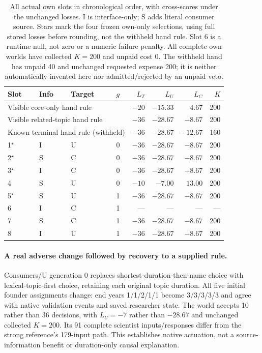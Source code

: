 \begin{table}[t]
\centering\small
\setlength{\tabcolsep}{5pt}
\begin{tabular}{llllrrrr}
\toprule
Slot & Info & Target & $g$ & $L_T$ & $L_U$ & $L_C$ & $K$\\
\midrule
\multicolumn{4}{l}{Visible core-only hand rule} & $-20$ & $-15.33$ & $4.67$ & 200\\
\multicolumn{4}{l}{Visible related-topic hand rule} & $-36$ & $-28.67$ & $-8.67$ & 200\\
\multicolumn{4}{l}{Known terminal hand rule (withheld)} & $-36$ & $-28.67$ & $-12.67$ & 160\\
\midrule
1$^\star$ & I & U & 0 & $-36$ & $-28.67$ & $-8.67$ & 200\\
2$^\star$ & S & C & 0 & $-36$ & $-28.67$ & $-8.67$ & 200\\
3$^\star$ & I & C & 0 & $-36$ & $-28.67$ & $-8.67$ & 200\\
4 & S & U & 0 & $-10$ & $-7.00$ & $13.00$ & 200\\
5$^\star$ & S & U & 1 & $-36$ & $-28.67$ & $-8.67$ & 200\\
6 & I & C & 1 & --- & --- & --- & ---\\
7 & S & C & 1 & $-36$ & $-28.67$ & $-8.67$ & 200\\
8 & I & U & 1 & $-36$ & $-28.67$ & $-8.67$ & 200\\
\bottomrule
\end{tabular}
\caption{All actual own slots in chronological order, with cross-scores under
the unchanged losses. I is interface-only; S adds literal consumer source.
Stars mark the four frozen own-only selections, using full stored losses before
rounding, not the withheld hand rule. Slot 6 is a runtime null, not zero or a
numeric failure penalty. All complete own worlds have collected $K=200$ and
unpaid cost 0. The withheld hand has unpaid 40 and unchanged requested expense
200; it is neither automatically invented here nor admitted/rejected by an
unpaid veto.}
\label{tab:native-consumer-source}
\end{table}

\paragraph{A real adverse change followed by recovery to a supplied rule.}
Consumers/U generation 0 replaces shortest-duration-then-name choice with
lexical-topic-first choice, retaining each original topic duration. All five
initial founder assignments change: end years 1/1/2/1/1 become 3/3/3/3/3 and
agree with native validation events and saved researcher state. The world
accepts 10 rather than 36 decisions, with $L_U=-7$ rather than $-28.67$ and
unchanged collected $K=200$. Its 91 complete scientist inputs/responses differ
from the strong reference's 179-input path. This establishes native actuation,
not a source-information benefit or duration-only causal explanation.

